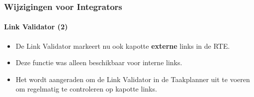 
\begin{frame}[fragile]
	\frametitle{Wijzigingen voor Integrators}
	\framesubtitle{Link Validator (2)}

	\begin{itemize}
		\item De Link Validator markeert nu ook kapotte \textbf{externe} links in de RTE.
		\item Deze functie was alleen beschikbaar voor interne links.
		\item Het wordt aangeraden om de Link Validator in de Taakplanner uit te voeren om regelmatig te controleren op kapotte links.
	\end{itemize}

\end{frame}

